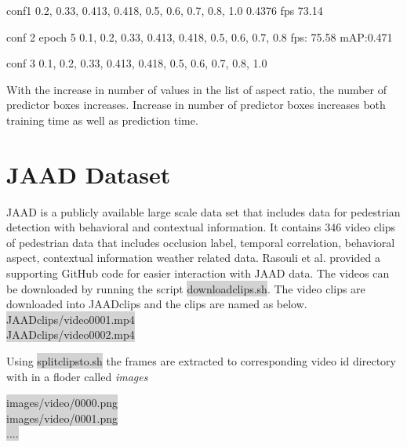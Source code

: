 conf1
0.2, 0.33, 0.413, 0.418, 0.5, 0.6, 0.7, 0.8, 1.0
0.4376
fps 73.14

conf 2
epoch 5
0.1, 0.2, 0.33, 0.413, 0.418, 0.5, 0.6, 0.7, 0.8
fps: 75.58 
mAP:0.471

conf 3 
0.1, 0.2, 0.33, 0.413, 0.418, 0.5, 0.6, 0.7, 0.8, 1.0





With the increase in number of values in the list of aspect ratio, the number of predictor boxes increases. Increase in number of predictor boxes increases both training time as well as prediction time.

\section{JAAD Dataset}

JAAD \cite{rasouli2017agreeing} is a publicly available large scale data set that includes data for pedestrian detection with behavioral and contextual information. It contains 346 video clips of pedestrian data that includes occlusion label, temporal correlation, behavioral aspect, contextual information weather related data. Rasouli et al. provided a supporting GitHub code for easier interaction with JAAD data. The videos can be downloaded by running the script \colorbox{lightgray}{download\textunderscore clips.sh}. The video clips are downloaded into JAAD\textunderscore clips and the clips are named as below.\\
\colorbox{lightgray} {JAAD\textunderscore clips/video\textunderscore  0001.mp4} \\
\colorbox{lightgray} {JAAD\textunderscore clips/video\textunderscore  0002.mp4}

Using \colorbox{lightgray}{split\textunderscore clips\textunderscore to\textunderscore .sh} the frames are extracted to corresponding video id directory with in a floder called \textit{images} \\
\begin{center}
\colorbox{lightgray} {images/video/0000.png} \\
\colorbox{lightgray} {images/video/0001.png} \\
\colorbox{lightgray} {....}
\end{center}

